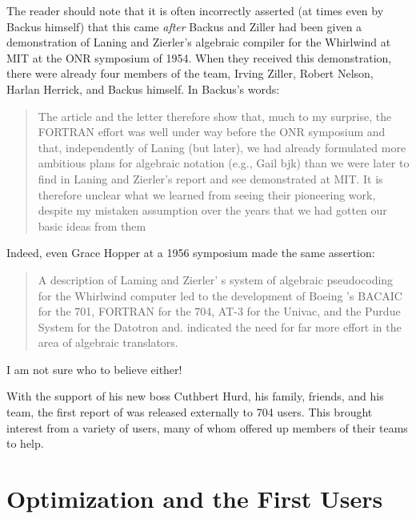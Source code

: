 The reader should note that it is often incorrectly asserted (at times even by
Backus himself\cite{Backus_1980_Programming_in_America_in_1950s}) that this
came \textit{after} Backus and Ziller had been given a demonstration of Laning
and Zierler's algebraic compiler for the Whirlwind at MIT at the ONR symposium
of 1954. When they received this demonstration, there were already four members
of the \FTN{} team, Irving Ziller, Robert Nelson, Harlan Herrick, and Backus
himself. In Backus's words\cite{Backus_1980_Programming_in_America_in_1950s}:

\begin{quotation}
  The article and the letter therefore show that, much to my surprise, the
  FORTRAN effort was well under way before the ONR symposium and that,
  independently of Laning (but later), we had already formulated more ambitious
  plans for algebraic notation (e.g., Gail bjk) than we were later to find in
  Laning and Zierler's report and see demonstrated at MIT. It is therefore
  unclear what we learned from seeing their pioneering work, despite my mistaken
  assumption over the years that we had gotten our basic ideas from them
\end{quotation}

Indeed, even Grace Hopper at a 1956 symposium made the same assertion:

\begin{quotation}
  A description of Laming and Zierler' s system of algebraic pseudocoding for
  the Whirlwind computer led to the development of Boeing 's BACAIC for the 701,
  FORTRAN for the 704, AT-3 for the Univac, and the Purdue System for the Datotron and. indicated the need for far more effort in the area of algebraic
  translators.
  \cite{Knuth_TrabbPardo_1976_Early_Development}
\end{quotation}

I am not sure who to believe either!

With the support of his new boss Cuthbert Hurd, his family, friends, and his
team, the first report of \FTN{} was released externally to 704 users. This
brought interest from a variety of users, many of whom offered up members of
their teams to help.

\section{\FTN{} Optimization and the First Users}

